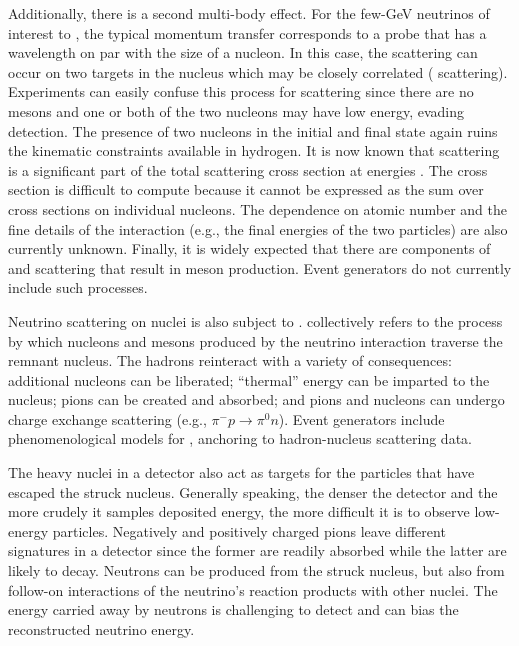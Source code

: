 Additionally, there is a second multi-body effect. For the few-GeV neutrinos of interest to , the typical momentum transfer corresponds to a probe that has a wavelength on par with the size of a nucleon. In this case, the scattering can occur on two targets in the nucleus which may be closely correlated ( scattering). Experiments can easily confuse this process for  scattering since there are no mesons and one or both of the two nucleons may have low energy, evading detection. The presence of two nucleons in the initial and final state again ruins the kinematic constraints available in hydrogen. It is now known that  scattering is a significant part of the total scattering cross section at  energies \cite{Ruterbories:2018gub}. The  cross section is difficult to compute because it cannot be expressed as the sum over cross sections on individual nucleons. The dependence on atomic number and the fine details of the interaction (e.g., the final energies of the two particles) are also currently unknown. Finally, it is widely expected that there are components of  and  scattering that result in meson production. Event generators do not currently include such processes.



Neutrino scattering on nuclei is also subject to .  collectively refers to the process by which nucleons and mesons produced by the neutrino interaction traverse the remnant nucleus. The hadrons reinteract with a variety of consequences: additional nucleons can be liberated; ``thermal'' energy can be imparted to the nucleus; pions can be created and absorbed; and pions and nucleons can undergo charge exchange scattering (e.g., $\pi^- p \to \pi^0 n$).  Event generators include phenomenological models for , anchoring to hadron-nucleus scattering data.


The heavy nuclei in a detector also act as targets for the particles that have escaped the struck nucleus. Generally speaking, the denser the detector and the more crudely it samples deposited energy, the more difficult it is to observe low-energy particles. Negatively and positively charged pions leave different signatures in a detector since the former are readily absorbed while the latter are likely to decay.  Neutrons can be produced from the struck nucleus, but also from follow-on interactions of the neutrino's reaction products with other nuclei. The energy carried away by neutrons is challenging to detect and can bias the reconstructed neutrino energy. 


